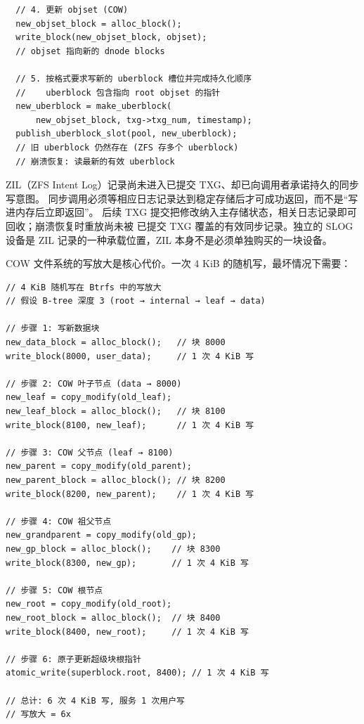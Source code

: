 \begin{filesystemlayout}
\begin{lstlisting}
  // 4. 更新 objset (COW)
  new_objset_block = alloc_block();
  write_block(new_objset_block, objset);
  // objset 指向新的 dnode blocks

  // 5. 按格式要求写新的 uberblock 槽位并完成持久化顺序
  //    uberblock 包含指向 root objset 的指针
  new_uberblock = make_uberblock(
      new_objset_block, txg->txg_num, timestamp);
  publish_uberblock_slot(pool, new_uberblock);
  // 旧 uberblock 仍然存在 (ZFS 存多个 uberblock)
  // 崩溃恢复: 读最新的有效 uberblock
\end{lstlisting}

ZIL（ZFS Intent Log）记录尚未进入已提交 TXG、却已向调用者承诺持久的同步写意图。
同步调用必须等相应日志记录达到稳定存储后才可成功返回，而不是“写进内存后立即返回”。
后续 TXG 提交把修改纳入主存储状态，相关日志记录即可回收；崩溃恢复时重放尚未被
已提交 TXG 覆盖的有效同步记录。独立的 SLOG 设备是 ZIL 记录的一种承载位置，ZIL
本身不是必须单独购买的一块设备。


COW 文件系统的写放大是核心代价。一次 4 KiB 的随机写，最坏情况下需要：

\begin{lstlisting}
// 4 KiB 随机写在 Btrfs 中的写放大
// 假设 B-tree 深度 3 (root → internal → leaf → data)

// 步骤 1: 写新数据块
new_data_block = alloc_block();   // 块 8000
write_block(8000, user_data);     // 1 次 4 KiB 写

// 步骤 2: COW 叶子节点 (data → 8000)
new_leaf = copy_modify(old_leaf);
new_leaf_block = alloc_block();   // 块 8100
write_block(8100, new_leaf);      // 1 次 4 KiB 写

// 步骤 3: COW 父节点 (leaf → 8100)
new_parent = copy_modify(old_parent);
new_parent_block = alloc_block(); // 块 8200
write_block(8200, new_parent);    // 1 次 4 KiB 写

// 步骤 4: COW 祖父节点
new_grandparent = copy_modify(old_gp);
new_gp_block = alloc_block();    // 块 8300
write_block(8300, new_gp);       // 1 次 4 KiB 写

// 步骤 5: COW 根节点
new_root = copy_modify(old_root);
new_root_block = alloc_block();  // 块 8400
write_block(8400, new_root);     // 1 次 4 KiB 写

// 步骤 6: 原子更新超级块根指针
atomic_write(superblock.root, 8400); // 1 次 4 KiB 写

// 总计: 6 次 4 KiB 写, 服务 1 次用户写
// 写放大 = 6x
\end{lstlisting}


\end{filesystemlayout}
